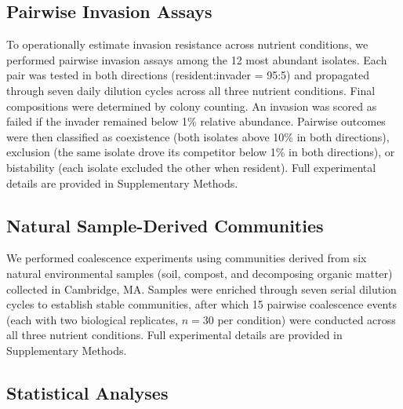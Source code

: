 \subsection*{Pairwise Invasion Assays}
\label{sec:methods:invasion}

To operationally estimate invasion resistance across nutrient conditions, we performed pairwise invasion assays among the 12 most abundant isolates. Each pair was tested in both directions (resident:invader = 95:5) and propagated through seven daily dilution cycles across all three nutrient conditions. Final compositions were determined by colony counting. An invasion was scored as failed if the invader remained below 1\% relative abundance. Pairwise outcomes were then classified as coexistence (both isolates above 10\% in both directions), exclusion (the same isolate drove its competitor below 1\% in both directions), or bistability (each isolate excluded the other when resident).  Full experimental details are provided in Supplementary Methods.



\subsection*{Natural Sample-Derived Communities}
\label{sec:methods:natural}

We performed coalescence experiments using communities derived from six natural environmental samples (soil, compost, and decomposing organic matter) collected in Cambridge, MA.  Samples were enriched through seven serial dilution cycles to establish stable communities, after which 15 pairwise coalescence events (each with two biological replicates, $n = 30$ per condition) were conducted across all three nutrient conditions. Full experimental details are provided in Supplementary Methods.


\subsection*{Statistical Analyses}
\label{sec:methods:statistics}

